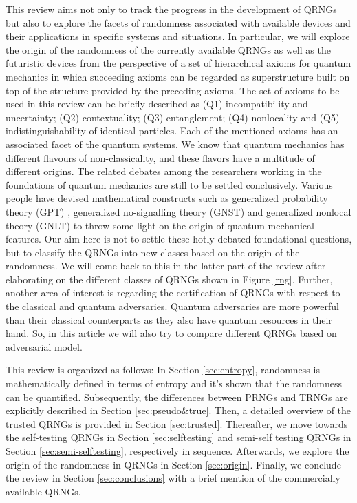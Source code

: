 \documentclass[]{interact}
\theoremstyle{plain}%
\theoremstyle{definition}
\theoremstyle{remark}
\begin{document}
This review aims not only to track the progress in the development of QRNGs but also to explore the facets of randomness associated with available devices and their applications in specific systems and situations. In particular, we will explore the origin of the randomness of the currently available QRNGs as well as the futuristic devices from the perspective of a set of hierarchical axioms for quantum mechanics \cite{aravinda2019hierarchical} in which succeeding axioms can be regarded as superstructure built on top of the structure provided by the preceding axioms. The set of axioms to be used in this review can be briefly described as (Q1) incompatibility and uncertainty; (Q2) contextuality; (Q3) entanglement; (Q4) nonlocality and (Q5) indistinguishability of identical particles. Each of the mentioned axioms has an associated facet of the quantum systems. We know that quantum mechanics has different flavours of non-classicality, and these flavors have a multitude of different origins. The related debates among the researchers working in the foundations of quantum mechanics are still to be settled conclusively. Various people have devised mathematical constructs such as generalized probability theory (GPT) \cite{janotta2014generalized,barrett2007information}, generalized no-signalling theory (GNST) \cite{masanes2006general} and generalized nonlocal theory (GNLT) \cite{barrett2005nonlocal} to throw some light on the origin of quantum mechanical features. Our aim here is not to settle these hotly debated foundational questions, but to classify the QRNGs into new classes based on the origin of the randomness. We will come back to this in the latter part of the review after elaborating on the different classes of QRNGs shown in Figure \ref{rng}. {Further, another area of interest is regarding the certification of QRNGs with respect to the classical and quantum adversaries. Quantum adversaries are more powerful than their classical counterparts as they also have quantum resources in their hand. So, in this article we will also try to compare different QRNGs based on adversarial model.} 

This review is organized as follows: In Section \ref{sec:entropy}, randomness is mathematically defined in terms of entropy and it's shown that the randomness can be quantified. Subsequently, the differences between PRNGs and TRNGs are explicitly described in Section \ref{sec:pseudo&true}. Then, a  detailed overview of the trusted QRNGs is provided in Section \ref{sec:trusted}. Thereafter, we move towards the self-testing QRNGs in Section \ref{sec:selftesting} and semi-self testing QRNGs in Section \ref{sec:semi-selftesting}, respectively in sequence. Afterwards, we explore the origin of the randomness in QRNGs in Section \ref{sec:origin}. Finally, we conclude the review in Section \ref{sec:conclusions} with a brief mention of the commercially available QRNGs.
\end{document}
